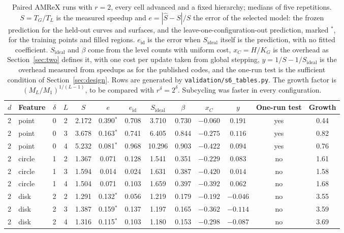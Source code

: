 \documentclass[12pt]{article}
\theoremstyle{remark}
\newcommand{\Sid}{S_{\mathrm{ideal}}}
\begin{document}
\begin{table}[ht]
\centering
\footnotesize
\setlength{\tabcolsep}{3.2pt}
\caption{Paired AMReX runs with $r=2$, every cell advanced and a fixed hierarchy; medians of five repetitions. $S=T_G/T_L$ is the measured speedup and $e=|\hat S-S|/S$ the error of the selected model: the frozen prediction for the held-out curves and surfaces, and the leave-one-configuration-out prediction, marked $^{*}$, for the training points and filled regions. $e_{\mathrm{id}}$ is the error when $\Sid$ itself is the prediction, with no fitted coefficient. $\Sid$ and $\beta$ come from the level counts with uniform cost, $x_C=H/K_G$ is the overhead as Section~\ref{sec:two} defines it, with one cost per update taken from global stepping, $y=1/S-1/\Sid$ is the overhead measured from speedups as for the published codes, and the one-run test is the sufficient condition of Section~\ref{sec:design}. Rows are generated by \texttt{validation/s6\_tables.py}. The growth factor is $(M_L/M_1)^{1/(L-1)}$, to be compared with $r^\delta=2^\delta$. Subcycling was faster in every configuration.}
\label{tab:amrex}
\begin{tabular}{llccccccccccc}
\toprule
$d$ & Feature & $\delta$ & $L$ & $S$ & $e$ & $e_{\mathrm{id}}$ & $\Sid$ & $\beta$ & $x_C$ & $y$ & One-run test & Growth\\
\midrule
2 & point & 0 & 2 & 2.172 & 0.390$^{*}$ & 0.708 & 3.710 & 0.730 & $-0.060$ & $0.191$ & yes & 0.44\\
2 & point & 0 & 3 & 3.678 & 0.163$^{*}$ & 0.741 & 6.405 & 0.844 & $-0.275$ & $0.116$ & yes & 0.82\\
2 & point & 0 & 4 & 5.232 & 0.081$^{*}$ & 0.968 & 10.296 & 0.903 & $-0.422$ & $0.094$ & yes & 0.76\\
2 & circle & 1 & 2 & 1.367 & 0.071 & 0.128 & 1.541 & 0.351 & $-0.229$ & $0.083$ & no & 1.61\\
2 & circle & 1 & 3 & 1.594 & 0.014 & 0.024 & 1.631 & 0.387 & $-0.420$ & $0.014$ & no & 1.58\\
2 & circle & 1 & 4 & 1.504 & 0.071 & 0.103 & 1.659 & 0.397 & $-0.392$ & $0.062$ & no & 1.68\\
2 & disk & 2 & 2 & 1.291 & 0.132$^{*}$ & 0.056 & 1.219 & 0.179 & $-0.192$ & $-0.046$ & no & 3.55\\
2 & disk & 2 & 3 & 1.387 & 0.159$^{*}$ & 0.137 & 1.197 & 0.165 & $-0.362$ & $-0.114$ & no & 3.59\\
2 & disk & 2 & 4 & 1.316 & 0.115$^{*}$ & 0.103 & 1.180 & 0.153 & $-0.298$ & $-0.087$ & no & 3.69\\

\end{tabular}
\end{table}
\end{document}
